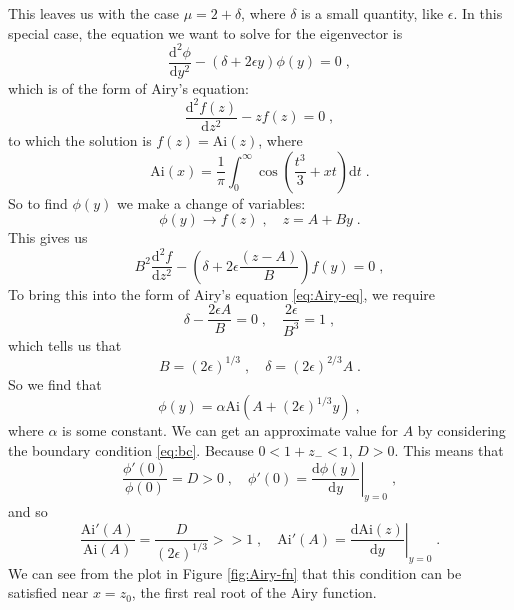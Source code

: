 \documentclass[a4paper,10pt]{article}
\newcommand{\D}{\mathrm{d}}
\newcommand{\Ai}{\mathrm{Ai}}
\begin{document}
This leaves us with the case $\mu = 2 + \delta$, where $\delta$ is a small quantity, like $\epsilon$. In this special case, the equation we want to solve for the eigenvector is
\begin{equation}\label{eq:ctm2}
   \frac{\D^2 \phi}{\D y^2} - (\delta + 2\epsilon y) \phi(y) = 0 \;,
\end{equation}
which is of the form of Airy's equation:
\begin{equation}\label{eq:Airy-eq}
  \frac{\D^2 f(z)}{\D z^2} - zf(z) = 0 \;,
\end{equation}
to which the solution is $f(z) = \Ai(z)$, where 
\begin{equation}\label{eq:Airy-fn}
  \Ai(x) = \frac{1}{\pi} \int_0^\infty \cos\left(\frac{t^3}{3} + xt\right) \D t \;.
\end{equation}
So to find $\phi(y)$ we make a change of variables:
\begin{equation}
  \phi(y) \to f(z) \;, \quad z = A + By \;.
\end{equation}
This gives us
\begin{equation}
  B^2 \frac{\D^2 f}{\D z^2} - \left( \delta + 2\epsilon \frac{(z-A)}{B} \right) f(y) = 0 \;,
\end{equation}
To bring this into the form of Airy's equation \eqref{eq:Airy-eq}, we require
\begin{equation}
  \delta - \frac{2\epsilon A}{B} = 0 \;, \quad \frac{2\epsilon}{B^3} = 1 \;,
\end{equation}
which tells us that 
\begin{equation}
  B = (2\epsilon)^{1/3} \;, \quad \delta = (2\epsilon)^{2/3} A \;.
\end{equation}
So we find that 
\begin{equation}\label{eq:phi_gen_soln}
  \phi(y) = \alpha \Ai(A + (2\epsilon)^{1/3}y) \;,
\end{equation}
where $\alpha$ is some constant. We can get an approximate value for $A$ by considering the boundary condition \eqref{eq:bc}. Because $0 < 1+z_- < 1$, $D > 0$. This means that
\begin{equation}
 \frac{\phi'(0)}{\phi(0)} = D > 0 \;, \quad \phi'(0) = \left. \frac{\D \phi(y)}{\D y} \right|_{y=0} \;,
\end{equation}
and so
\begin{equation}
  \frac{\Ai'(A)}{\Ai(A)} = \frac{D}{(2\epsilon)^{1/3}} >> 1 \;, \quad \Ai'(A) = \left. \frac{\D \Ai(z)}{\D y} \right|_{y=0} \;.
\end{equation}
We can see from the plot in Figure \ref{fig:Airy-fn} that this condition can be satisfied near $x=z_0$, the first real root of the Airy function.
\end{document}

